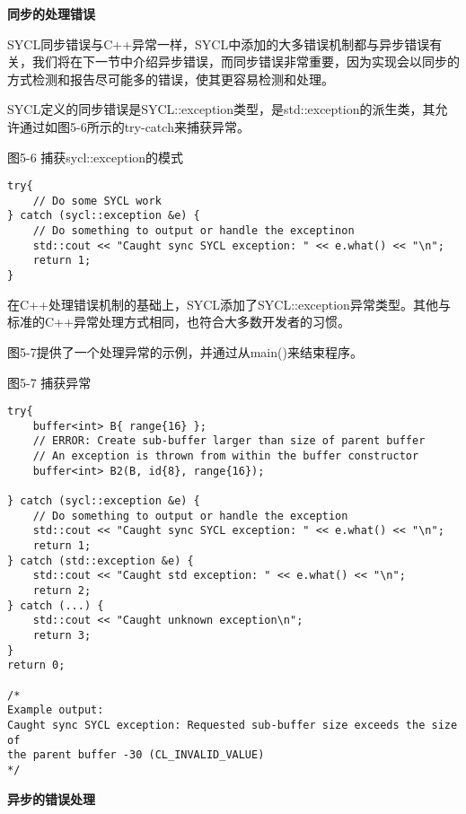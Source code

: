 \hspace*{\fill} \par %
\textbf{同步的处理错误}

SYCL同步错误与C++异常一样，SYCL中添加的大多错误机制都与异步错误有关，我们将在下一节中介绍异步错误，而同步错误非常重要，因为实现会以同步的方式检测和报告尽可能多的错误，使其更容易检测和处理。\par

SYCL定义的同步错误是SYCL::exception类型，是std::exception的派生类，其允许通过如图5-6所示的try-catch来捕获异常。\par

\hspace*{\fill} \par %
图5-6 捕获sycl::exception的模式
\begin{lstlisting}[caption={}]
try{
	// Do some SYCL work
} catch (sycl::exception &e) {
	// Do something to output or handle the exceptinon 
	std::cout << "Caught sync SYCL exception: " << e.what() << "\n";
	return 1;
} 
\end{lstlisting}

在C++处理错误机制的基础上，SYCL添加了SYCL::exception异常类型。其他与标准的C++异常处理方式相同，也符合大多数开发者的习惯。\par

图5-7提供了一个处理异常的示例，并通过从main()来结束程序。\par

\hspace*{\fill} \par %
图5-7 捕获异常
\begin{lstlisting}[caption={}]
try{
	buffer<int> B{ range{16} };
	// ERROR: Create sub-buffer larger than size of parent buffer
	// An exception is thrown from within the buffer constructor
	buffer<int> B2(B, id{8}, range{16});
	
} catch (sycl::exception &e) {
	// Do something to output or handle the exception 
	std::cout << "Caught sync SYCL exception: " << e.what() << "\n";
	return 1;
} catch (std::exception &e) {
	std::cout << "Caught std exception: " << e.what() << "\n";
	return 2;
} catch (...) {
	std::cout << "Caught unknown exception\n";
	return 3;
}
return 0;

/*
Example output:
Caught sync SYCL exception: Requested sub-buffer size exceeds the size of 
the parent buffer -30 (CL_INVALID_VALUE)
*/
\end{lstlisting}

\hspace*{\fill} \par %
\textbf{异步的错误处理}

